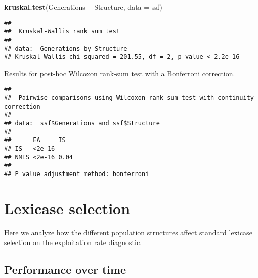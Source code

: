 \documentclass[]{book}
\newenvironment{Shaded}{\begin{snugshade}}{\end{snugshade}}
\newcommand{\DataTypeTok}[1]{\textcolor[rgb]{0.13,0.29,0.53}{#1}}
\newcommand{\KeywordTok}[1]{\textcolor[rgb]{0.13,0.29,0.53}{\textbf{#1}}}
\newcommand{\NormalTok}[1]{#1}
\newcommand{\OperatorTok}[1]{\textcolor[rgb]{0.81,0.36,0.00}{\textbf{#1}}}
\newcommand{\OtherTok}[1]{\textcolor[rgb]{0.56,0.35,0.01}{#1}}
\newcommand{\StringTok}[1]{\textcolor[rgb]{0.31,0.60,0.02}{#1}}
\begin{document}
\begin{Shaded}
\begin{Highlighting}[]
\KeywordTok{kruskal.test}\NormalTok{(Generations }\OperatorTok{~}\StringTok{ }\NormalTok{Structure, }\DataTypeTok{data =}\NormalTok{ ssf)}
\end{Highlighting}
\end{Shaded}

\begin{verbatim}
## 
##  Kruskal-Wallis rank sum test
## 
## data:  Generations by Structure
## Kruskal-Wallis chi-squared = 201.55, df = 2, p-value < 2.2e-16
\end{verbatim}

Results for post-hoc Wilcoxon rank-sum test with a Bonferroni correction.

\begin{Shaded}
\end{Shaded}

\begin{verbatim}
## 
##  Pairwise comparisons using Wilcoxon rank sum test with continuity correction 
## 
## data:  ssf$Generations and ssf$Structure 
## 
##      EA     IS  
## IS   <2e-16 -   
## NMIS <2e-16 0.04
## 
## P value adjustment method: bonferroni
\end{verbatim}

\hypertarget{lexicase-selection-8}{%
\section{Lexicase selection}\label{lexicase-selection-8}}

Here we analyze how the different population structures affect standard lexicase selection on the exploitation rate diagnostic.

\hypertarget{performance-over-time-20}{%
\subsection{Performance over time}\label{performance-over-time-20}}
\end{document}
